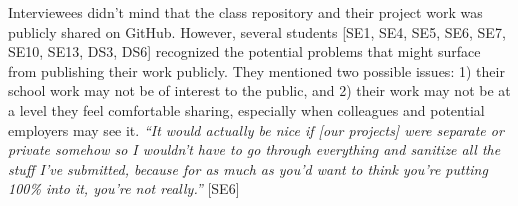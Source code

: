 Interviewees didn't mind that the class repository and their project work was publicly shared on GitHub. However, several students [SE1, SE4, SE5, SE6, SE7, SE10, SE13, DS3, DS6] recognized the potential problems that might surface from publishing their work publicly. They mentioned two possible issues: 1) their school work may not be of interest to the public, and 2) their work may not be at a level they feel comfortable sharing, especially when colleagues and potential employers may see it.
\textit{``It would actually be nice if [our projects] were separate or private somehow so I wouldn't have to go through everything and sanitize all the stuff I've submitted, because for as much as you'd want to think you're putting 100\% into it, you're not really.''} [SE6]




